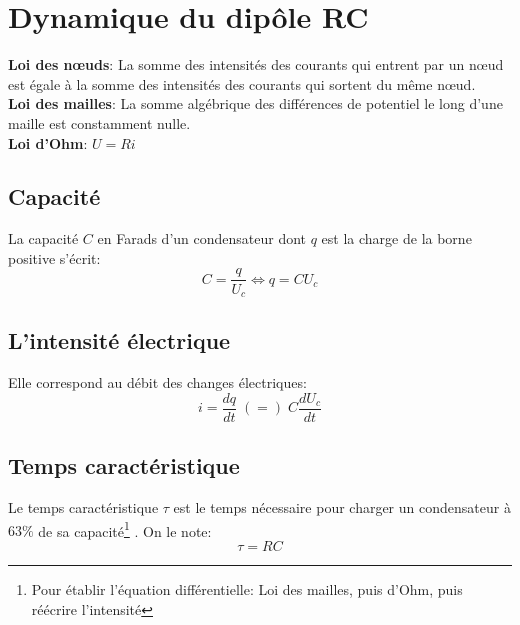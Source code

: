 \documentclass[a5paper,10pt]{article}
\begin{document}
\section{Dynamique du dipôle RC}
\textbf{Loi des nœuds}: La somme des intensités des courants qui entrent par un nœud est égale à la somme des intensités des courants qui sortent du même nœud.\\
\textbf{Loi des mailles}: La somme algébrique des différences de potentiel le long d'une maille est constamment nulle.\\
\textbf{Loi d'Ohm}: $U=Ri$
\subsection{Capacité}
La capacité $C$ en Farads d'un condensateur dont $q$ est la charge de la borne positive s'écrit:
$$C=\frac{q}{U_c} \iff q=CU_c$$
\subsection{L'intensité électrique}
Elle correspond au débit des changes électriques:
$$i=\frac{dq}{dt}\;(=)\;C\frac{dU_c}{dt}$$
\subsection{Temps caractéristique}
Le temps caractéristique $\tau$ est le temps nécessaire pour charger un condensateur à $63\%$ de sa capacité\footnote{Pour établir l'équation différentielle: Loi des mailles, puis d'Ohm, puis réécrire l'intensité}
. On le note:
$$\tau=RC$$
\end{document}
